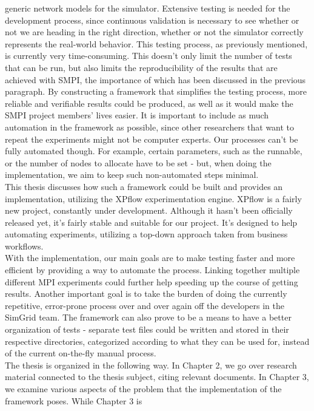 generic network models for
the simulator. Extensive testing is needed for the development
process, since continuous validation is necessary to see whether or
not we are heading in the right direction, whether or not the
simulator correctly represents the real-world behavior. This
testing process, as previously mentioned, is currently very
time-consuming. This doesn't only limit the number of tests that can
be run, but also limits the reproducibility of the
results that are achieved with SMPI, the importance of which has been
discussed in the previous paragraph. By constructing a framework that
simplifies the testing process, more reliable and verifiable results
could be produced, as well as it would make the SMPI project members'
lives easier. It is important to include as much automation in the
framework as possible, since other researchers that want to repeat the
experiments might not be computer experts. Our processes can't be
fully automated though. For example, certain parameters, such as the
runnable, or the number of nodes to allocate have to be set - but,
when doing the implementation, we aim to keep such non-automated steps
minimal.\\[0.3cm]
This thesis discusses how such a framework could be built and provides
an implementation, utilizing the XPflow\cite{bn12_2} experimentation
engine. XPflow is a fairly new project, constantly under development.
Although it hasn't been officially released yet, it's fairly stable
and suitable for our project. It's designed to help automating
experiments, utilizing a top-down approach taken from business
workflows.\\[0.3cm]
With the implementation, our main goals are to make testing faster and
more efficient by providing a way to automate the process. Linking
together multiple different MPI experiments could further help
speeding up the course of getting results. Another
important goal is to take the burden of doing the currently
repetitive, error-prone process over and over again off the developers
in the SimGrid team. The framework can also prove to be a means to
have a better organization of tests - separate test files could be
written and stored in their respective directories, categorized
according to what they can be used for, instead of the current
on-the-fly manual process.\\[0.3cm]
The thesis is organized in the following way. In Chapter 2, we go over
research material connected to the thesis subject, citing relevant
documents. In Chapter 3, we examine various aspects of the problem
that the implementation of the framework poses. While Chapter 3 is
